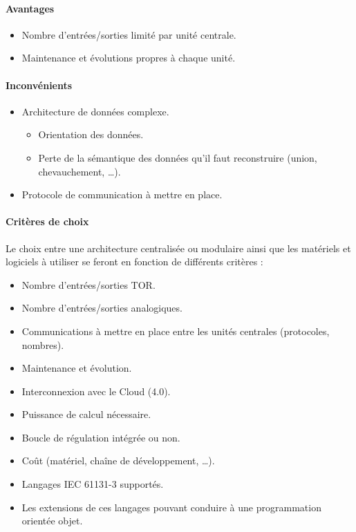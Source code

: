 \begin{minipage}{0.45\linewidth}
    \paragraph{Avantages}
    \begin{itemize}
        \item Nombre d'entrées/sorties limité par unité centrale.
        \item Maintenance et évolutions propres à chaque unité.
    \end{itemize}
\end{minipage}%
%
\begin{minipage}{0.45\linewidth}
    \paragraph{Inconvénients}
    \begin{itemize}
        \item Architecture de données complexe.
        \begin{itemize}
            \item Orientation des données.
            \item Perte de la sémantique des données qu'il faut reconstruire (union, chevauchement, \dots).
        \end{itemize}
        \item Protocole de communication à mettre en place.
    \end{itemize}
\end{minipage}


\paragraph{Critères de choix}
Le choix entre une architecture centralisée ou modulaire ainsi que les matériels et logiciels à utiliser se feront en fonction de différents critères : 
\begin{itemize}
    \item Nombre d'entrées/sorties TOR.
    \item Nombre d'entrées/sorties analogiques.
    \item Communications à mettre en place entre les unités centrales (protocoles, nombres).
    \item Maintenance et évolution.
    \item Interconnexion avec le Cloud (4.0).
    \item Puissance de calcul nécessaire.
    \item Boucle de régulation intégrée ou non.
    \item Coût (matériel, chaîne de développement, \dots).
    \item Langages IEC 61131-3 supportés.
    \item Les extensions de ces langages pouvant conduire à une programmation orientée objet.
\end{itemize}


